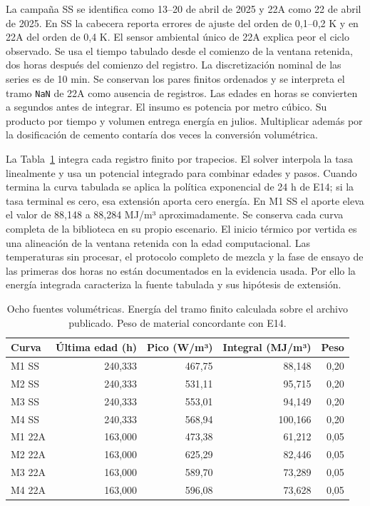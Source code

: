 \documentclass[11pt,a4paper]{article}
\begin{document}
La campaña SS se identifica como 13--20 de abril de 2025 y 22A como 22 de abril de 2025. En SS la cabecera reporta errores de ajuste del orden de 0,1--0,2 K y en 22A del orden de 0,4 K. El sensor ambiental único de 22A explica peor el ciclo observado. Se usa el tiempo tabulado desde el comienzo de la ventana retenida, dos horas después del comienzo del registro. La discretización nominal de las series es de 10 min. Se conservan los pares finitos ordenados y se interpreta el tramo \texttt{NaN} de 22A como ausencia de registros. Las edades en horas se convierten a segundos antes de integrar. El insumo es potencia por metro cúbico. Su producto por tiempo y volumen entrega energía en julios. Multiplicar además por la dosificación de cemento contaría dos veces la conversión volumétrica.

La Tabla~\ref{tab:hid} integra cada registro finito por trapecios. El solver interpola la tasa linealmente y usa un potencial integrado para combinar edades y pasos. Cuando termina la curva tabulada se aplica la política exponencial de 24 h de E14; si la tasa terminal es cero, esa extensión aporta cero energía. En M1 SS el aporte eleva el valor de 88,148 a 88,284 MJ/m³ aproximadamente. Se conserva cada curva completa de la biblioteca en su propio escenario. El inicio térmico por vertida es una alineación de la ventana retenida con la edad computacional. Las temperaturas sin procesar, el protocolo completo de mezcla y la fase de ensayo de las primeras dos horas no están documentados en la evidencia usada. Por ello la energía integrada caracteriza la fuente tabulada y sus hipótesis de extensión.

\begin{table}[htbp]
\centering\small
\caption{Ocho fuentes volumétricas. Energía del tramo finito calculada sobre el archivo publicado. Peso de material concordante con E14.}
\label{tab:hid}
\begin{tabular}{@{}lrrrr@{}}
\toprule
Curva & Última edad (h) & Pico (W/m³) & Integral (MJ/m³) & Peso \\
\midrule
M1 SS  &240,333&467,75&88,148&0,20\\
M2 SS  &240,333&531,11&95,715&0,20\\
M3 SS  &240,333&553,01&94,149&0,20\\
M4 SS  &240,333&568,94&100,166&0,20\\
M1 22A &163,000&473,38&61,212&0,05\\
M2 22A &163,000&625,29&82,446&0,05\\
M3 22A &163,000&589,70&73,289&0,05\\
M4 22A &163,000&596,08&73,628&0,05\\
\bottomrule
\end{tabular}
\end{table}
\end{document}
